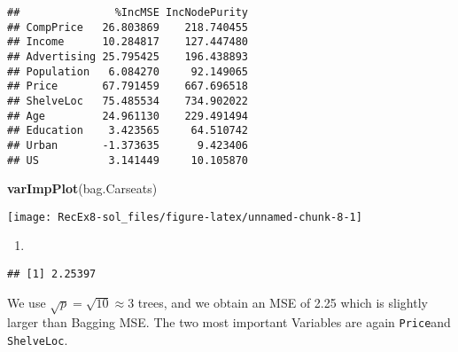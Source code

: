 \documentclass[]{article}
\newenvironment{Shaded}{\begin{snugshade}}{\end{snugshade}}
\newcommand{\DataTypeTok}[1]{\textcolor[rgb]{0.13,0.29,0.53}{#1}}
\newcommand{\DecValTok}[1]{\textcolor[rgb]{0.00,0.00,0.81}{#1}}
\newcommand{\KeywordTok}[1]{\textcolor[rgb]{0.13,0.29,0.53}{\textbf{#1}}}
\newcommand{\NormalTok}[1]{#1}
\newcommand{\OperatorTok}[1]{\textcolor[rgb]{0.81,0.36,0.00}{\textbf{#1}}}
\newcommand{\OtherTok}[1]{\textcolor[rgb]{0.56,0.35,0.01}{#1}}
\newcommand{\StringTok}[1]{\textcolor[rgb]{0.31,0.60,0.02}{#1}}
\begin{document}
\begin{verbatim}
##               %IncMSE IncNodePurity
## CompPrice   26.803869    218.740455
## Income      10.284817    127.447480
## Advertising 25.795425    196.438893
## Population   6.084270     92.149065
## Price       67.791459    667.696518
## ShelveLoc   75.485534    734.902022
## Age         24.961130    229.491494
## Education    3.423565     64.510742
## Urban       -1.373635      9.423406
## US           3.141449     10.105870
\end{verbatim}

\begin{Shaded}
\begin{Highlighting}[]
\KeywordTok{varImpPlot}\NormalTok{(bag.Carseats)}
\end{Highlighting}
\end{Shaded}

\texttt{[image: RecEx8-sol\_files/figure-latex/unnamed-chunk-8-1]}

\begin{enumerate}
\def\labelenumi{\alph{enumi})}
\setcounter{enumi}{4}
\item
\end{enumerate}

\begin{Shaded}
\end{Shaded}

\begin{verbatim}
## [1] 2.25397
\end{verbatim}

We use \(\sqrt{p} = \sqrt{10} \approx 3\) trees, and we obtain an MSE of
2.25 which is slightly larger than Bagging MSE. The two most important
Variables are again \texttt{Price}and \texttt{ShelveLoc}.
\end{document}
